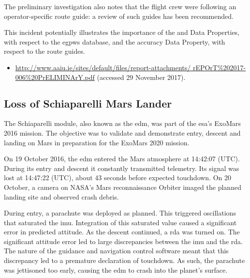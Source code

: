 The preliminary investigation also notes that the flight crew were following an operator-specific route guide: a review of such guides has been recommended.

This incident potentially illustrates the importance of the  and  Data Properties, with respect to the \gls{egpws} \gls{database}, and the \gls{accuracy} Data Property, with respect to the route guides.

\begin{samepage}
\begin{itemize}
  \item \raggedright{\href{http://www.aaiu.ie/sites/default/files/report-attachments/rEPOrT\%202017-006\%20PrELIMINArY.pdf}{http://www.aaiu.ie/sites/default/files/report-attachments/ rEPOrT\%202017-006\%20PrELIMINArY.pdf} (accessed 29 November 2017).}
\end{itemize}
\end{samepage}


\subsection{Loss of Schiaparelli Mars Lander} \label{bkm:incacc:schiaparelli}
The Schiaparelli module, also known as the \gls{edm}, was part of the \gls{esa}'s ExoMars 2016 mission. The objective was to validate and demonstrate entry, descent and landing on Mars in preparation for the ExoMars 2020 mission.

On 19 October 2016, the \gls{edm} entered the Mars atmosphere at 14:42:07 (UTC). During its entry and descent it constantly transmitted telemetry. Its signal was lost at 14:47:22 (UTC), about 43 seconds before expected touchdown. On 20 October, a camera on NASA's Mars reconnaissance Orbiter imaged the planned landing site and observed crash debris.

During entry, a parachute was deployed as planned. This triggered oscillations that saturated the \gls{imu}. Integration of this saturated value caused a significant error in predicted attitude. As the descent continued, a \gls{rda} was turned on. The significant attitude error led to large discrepancies between the \gls{imu} and the \gls{rda}. The nature of the guidance and navigation control software meant that this discrepancy led to a premature declaration of touchdown. As such, the parachute was jettisoned too early, causing the \gls{edm} to crash into the planet's surface.

